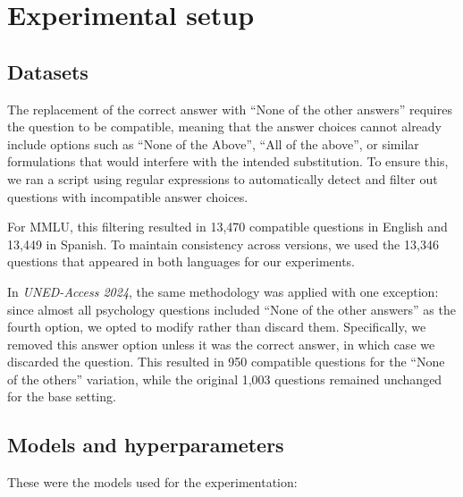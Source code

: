 \section{Experimental setup}
\label{appendix-exps}

\subsection{Datasets}

The replacement of the correct answer with ``None of the other answers'' requires the question to be compatible, meaning that the answer choices cannot already include options such as ``None of the Above'', ``All of the above'', or similar formulations that would interfere with the intended substitution. To ensure this, we ran a script using regular expressions to automatically detect and filter out questions with incompatible answer choices.

For MMLU, this filtering resulted in 13,470 compatible questions in English and 13,449 in Spanish. To maintain consistency across versions, we used the 13,346 questions that appeared in both languages for our experiments.

In \textit{UNED-Access 2024}, the same methodology was applied with one exception: since almost all psychology questions included ``None of the other answers'' as the fourth option, we opted to modify rather than discard them. Specifically, we removed this answer option unless it was the correct answer, in which case we discarded the question. This resulted in 950 compatible questions for the ``None of the others'' variation, while the original 1,003 questions remained unchanged for the base setting.


\subsection{Models and hyperparameters}

These were the models used for the experimentation: 

